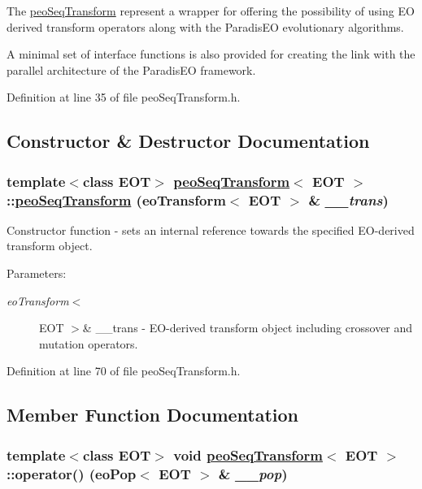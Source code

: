 The \hyperlink{classpeoSeqTransform}{peo\-Seq\-Transform} represent a wrapper for offering the possibility of using EO derived transform operators along with the Paradis\-EO evolutionary algorithms. 

A minimal set of interface functions is also provided for creating the link with the parallel architecture of the Paradis\-EO framework. 



Definition at line 35 of file peo\-Seq\-Transform.h.

\subsection{Constructor \& Destructor Documentation}
\hypertarget{classpeoSeqTransform_3b8e4ed19d9458938eb669d83a53c626}{
\subsubsection[peoSeqTransform]{\setlength{\rightskip}{0pt plus 5cm}template$<$class EOT$>$ \hyperlink{classpeoSeqTransform}{peo\-Seq\-Transform}$<$ EOT $>$::\hyperlink{classpeoSeqTransform}{peo\-Seq\-Transform} (eo\-Transform$<$ EOT $>$ \& {\em \_\-\_\-trans})}}
\label{classpeoSeqTransform_3b8e4ed19d9458938eb669d83a53c626}


Constructor function - sets an internal reference towards the specified EO-derived transform object. 

\begin{Desc}
\item[Parameters:]
\begin{description}
\item[{\em eo\-Transform$<$}]EOT $>$\& \_\-\_\-trans - EO-derived transform object including crossover and mutation operators. \end{description}
\end{Desc}


Definition at line 70 of file peo\-Seq\-Transform.h.

\subsection{Member Function Documentation}
\hypertarget{classpeoSeqTransform_1ba63536abb6c4e1c369e0b7e066872e}{
\subsubsection[operator()]{\setlength{\rightskip}{0pt plus 5cm}template$<$class EOT$>$ void \hyperlink{classpeoSeqTransform}{peo\-Seq\-Transform}$<$ EOT $>$::operator() (eo\-Pop$<$ EOT $>$ \& {\em \_\-\_\-pop})}}
\label{classpeoSeqTransform_1ba63536abb6c4e1c369e0b7e066872e}


